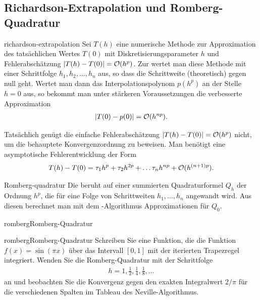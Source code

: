 \subsection{Richardson-Extrapolation und Romberg-Quadratur}

\begin{Definition}{richardson-extrapolation}
  Sei $T(h)$ eine numerische Methode zur Approximation des
  tatsächlichen Wertes $T(0)$ mit Diskretisierungsparameter $h$ und
  Fehlerabschätzung $\lvert T(h)-T(0)\rvert = \mathcal O(h^p)$. Zur
   wertet man diese Methode mit einer
  Schrittfolge $h_1, h_2,\ldots,h_n$ aus, so dass die Schrittweite
  (theoretisch) gegen null geht. Wertet man dann das
  Interpolationspolynom $p(h^p)$ an der Stelle $h=0$ aus, so bekommt
  man unter stärkeren Voraussetzungen die verbesserte Approximation
  \begin{gather}
    \lvert T(0)-p(0)\rvert = \mathcal O(h^{np}).
  \end{gather}
\end{Definition}

\begin{remark}
  Tatsächlich genügt die einfache Fehlerabschätzung
  $\lvert T(h)-T(0)\rvert = \mathcal O(h^p)$ nicht, um die behauptete
  Konvergenzordnung zu beweisen. Man benötigt eine asymptotische
  Fehlerentwicklung der Form
  \begin{gather}
    \label{eq:Richardson-error}
    T(h)-T(0) = \tau_1 h^p + \tau_2 h^{2p} + \dots \tau_n h^{np}
    + \mathcal O(h^{(n+1)p}).
  \end{gather}
\end{remark}

\begin{Definition}{Romberg-quadratur}
  Die  beruht auf einer summierten
  Quadraturformel $Q_h$ der Ordnung $h^p$, die für eine Folge von
  Schrittweiten $h_1,\dots, h_n$ angewandt wird. Aus diesen berechnet
  man mit dem -Algorithmus Approximationen für
  $Q_0$.
\end{Definition}

\begin{Algorithmus*}{romberg}{Romberg-Quadratur}
  
\end{Algorithmus*}

\begin{Aufgabe*}{romberg}{Romberg-Quadratur}
  Schreiben Sie eine Funktion, die die Funktion $f(x) = \sin(\pi x)$
  über das Intervall $[0,1]$ mit der iterierten Trapezregel
  integriert. Wenden Sie die Romberg-Quadratur mit der Schrittfolge
  \begin{gather}
    h = 1,\frac12,\frac14,\frac18,\dots
  \end{gather}
  an und beobachten Sie die Konvergenz gegen den exakten Integralwert
  $2/\pi$ für die verschiedenen Spalten im Tableau des
  Neville-Algorithmus.
\end{Aufgabe*}

